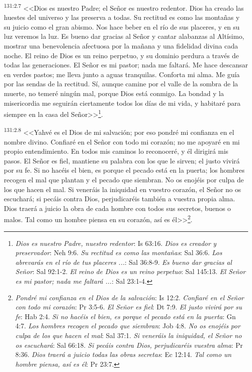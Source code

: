 \par 
\textsuperscript{131:2.7} <<Dios es nuestro Padre; el Señor es nuestro redentor. Dios ha creado las huestes del universo y las preserva a todas. Su rectitud es como las montañas y su juicio como el gran abismo. Nos hace beber en el río de sus placeres, y en su luz veremos la luz. Es bueno dar gracias al Señor y cantar alabanzas al Altísimo, mostrar una benevolencia afectuosa por la mañana y una fidelidad divina cada noche. El reino de Dios es un reino perpetuo, y su dominio perdura a través de todas las generaciones. El Señor es mi pastor; nada me faltará. Me hace descansar en verdes pastos; me lleva junto a aguas tranquilas. Conforta mi alma. Me guía por las sendas de la rectitud. Sí, aunque camine por el valle de la sombra de la muerte, no temeré ningún mal, porque Dios está conmigo. La bondad y la misericordia me seguirán ciertamente todos los días de mi vida, y habitaré para siempre en la casa del Señor>>\footnote{\textit{Dios es nuestro Padre, nuestro redentor}: Is 63:16. \textit{Dios es creador y preservador}: Neh 9:6. \textit{Su rectitud es como las montañas}: Sal 36:6. \textit{Los abrevarás en el río de tus placeres ...}: Sal 36:8-9. \textit{Es bueno dar gracias al Señor}: Sal 92:1-2. \textit{El reino de Dios es un reino perpetuo}: Sal 145:13. \textit{El Señor es mi pastor; nada me faltará ...}: Sal 23:1-4.}.

\par 
\textsuperscript{131:2.8} <<Yahvé es el Dios de mi salvación; por eso pondré mi confianza en el nombre divino. Confiaré en el Señor con todo mi corazón; no me apoyaré en mi propio entendimiento. En todos mis caminos lo reconoceré, y él dirigirá mis pasos. El Señor es fiel, mantiene su palabra con los que le sirven; el justo vivirá por su fe. Si no hacéis el bien, es porque el pecado está en la puerta; los hombres recogen el mal que plantan y el pecado que siembran. No os enojéis por culpa de los que hacen el mal. Si veneráis la iniquidad en vuestro corazón, el Señor no os escuchará; si pecáis contra Dios, perjudicaréis también a vuestra propia alma. Dios traerá a juicio la obra de cada hombre con todos sus secretos, buenos o malos. Tal como un hombre piensa en su corazón, así es él>>\footnote{\textit{Pondré mi confianza en el Dios de la salvación}: Is 12:2. \textit{Confiaré en el Señor con todo mi corazón}: Pr 3:5-6. \textit{El Señor es fiel}: Dt 7:9. \textit{El justo vivirá por su fe}: Hab 2:4. \textit{Si no hacéis el bien, es porque el pecado está en la puerta}: Gn 4:7. \textit{Los hombres recogen el pecado que siembran}: Job 4:8. \textit{No os enojéis por culpa de los que hacen el mal}: Sal 37:1. \textit{Si veneráis la iniquidad, el Señor no os escuchará}: Sal 66:18. \textit{Si pecáis contra Dios, perjudicaréis vuestra alma}: Pr 8:36. \textit{Dios traerá a juicio todas las obras secretas}: Ec 12:14. \textit{Tal como un hombre piensa, así es él}: Pr 23:7.}.

